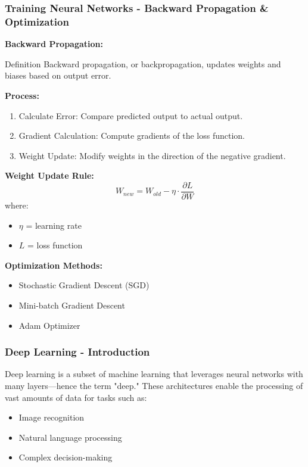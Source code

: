 \documentclass{beamer}
\begin{document}
\begin{frame}[fragile]
    \frametitle{Training Neural Networks - Backward Propagation & Optimization}
    \textbf{Backward Propagation:}
    \begin{block}{Definition}
        Backward propagation, or backpropagation, updates weights and biases based on output error.
    \end{block}
    
    \textbf{Process:}
    \begin{enumerate}
        \item Calculate Error: Compare predicted output to actual output.
        \item Gradient Calculation: Compute gradients of the loss function.
        \item Weight Update: Modify weights in the direction of the negative gradient.
    \end{enumerate}

    \textbf{Weight Update Rule:}
    \begin{equation}
        W_{new} = W_{old} - \eta \cdot \frac{\partial L}{\partial W}
    \end{equation}
    where:
    \begin{itemize}
        \item \( \eta \) = learning rate
        \item \( L \) = loss function
    \end{itemize}
    
    \textbf{Optimization Methods:}
    \begin{itemize}
        \item Stochastic Gradient Descent (SGD)
        \item Mini-batch Gradient Descent
        \item Adam Optimizer
    \end{itemize}
\end{frame}

\begin{frame}[fragile]
    \frametitle{Deep Learning - Introduction}
    Deep learning is a subset of machine learning that leverages neural networks with many layers—hence the term "deep." 
    These architectures enable the processing of vast amounts of data for tasks such as:
    \begin{itemize}
        \item Image recognition
        \item Natural language processing
        \item Complex decision-making
    \end{itemize}
\end{frame}
\end{document}
